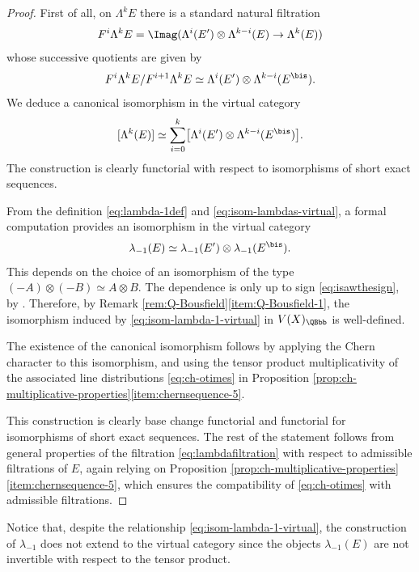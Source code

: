 \begin{proof}

First of all, on $\Lambda^k E$ there is a standard natural filtration
\begin{displaymath} F^i \Lambda^k E =\Imag ( \Lambda^{i} (E^{\prime}) \otimes \Lambda^{k-i}(E) \to \Lambda^k (E))
\end{displaymath} whose successive quotients are given by
\begin{equation}\label{eq:lambdafiltration}
F^i\Lambda^k E/F^{i+1}\Lambda^k E \simeq \Lambda^{i} (E^{\prime}) \otimes \Lambda^{k-i} (E^{\bis}).
\end{equation}
We deduce a canonical isomorphism in the virtual category
\begin{equation}\label{eq:isom-lambdas-virtual}
[\Lambda^k (E)] \simeq \sum_{i=0}^k \bigl[ \Lambda^{i} (E^{\prime}) \otimes \Lambda^{k-i} (E^{\bis}) \bigr].
\end{equation}
The construction is clearly functorial with respect to isomorphisms of short exact sequences.

From the definition \eqref{eq:lambda-1def} and \eqref{eq:isom-lambdas-virtual}, a formal computation provides an isomorphism in the virtual category
\begin{equation}\label{eq:isom-lambda-1-virtual}
\lambda_{-1}(E) \simeq \lambda_{-1}(E^{\prime}) \otimes \lambda_{-1}(E^{\bis}).
\end{equation}
This depends on the choice of an isomorphism of the type $(-A) \otimes (-B) \simeq A \otimes B$. The dependence is only up to sign \eqref{eq:isawthesign}, by \cite[ (b)]{Deligne-determinant}. Therefore, by Remark \ref{rem:Q-Bousfield}\eqref{item:Q-Bousfield-1}, the isomorphism induced by \eqref{eq:isom-lambda-1-virtual} in $V(X)_{\QBbb}$ is well-defined.

The existence of the canonical isomorphism follows by applying the Chern character to this isomorphism, and using the tensor product multiplicativity of the associated line distributions \eqref{eq:ch-otimes} in Proposition \ref{prop:ch-multiplicative-properties}\eqref{item:chernsequence-5}.

This construction is clearly base change functorial and functorial for isomorphisms of short exact sequences. The rest of the statement follows from general properties of the filtration \eqref{eq:lambdafiltration} with respect to admissible filtrations of $E$, again relying on Proposition \ref{prop:ch-multiplicative-properties}\eqref{item:chernsequence-5}, which ensures the compatibility of \eqref{eq:ch-otimes} with admissible filtrations.
\end{proof}
\begin{remark}
Notice that, despite the relationship \eqref{eq:isom-lambda-1-virtual}, the construction of $\lambda_{-1}$ does not extend to the virtual category since the objects $\lambda_{-1}(E)$ are not invertible with respect to the tensor product.
\end{remark}

